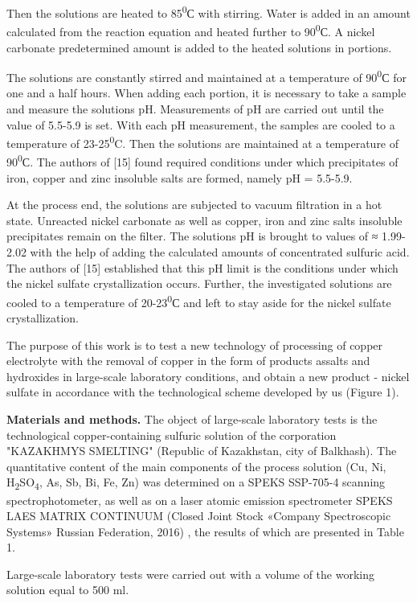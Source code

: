 \begin{multicols}{2}
Then the solutions are heated to 85\textsuperscript{0}С with stirring.
Water is added in an amount calculated from the reaction equation and
heated further to 90\textsuperscript{0}С. A nickel carbonate
predetermined amount is added to the heated solutions in portions.

The solutions are constantly stirred and maintained at a temperature of
90\textsuperscript{0}С for one and a half hours. When adding each
portion, it is necessary to take a sample and measure the solutions pH.
Measurements of pH are carried out until the value of 5.5-5.9 is set.
With each pH measurement, the samples are cooled to a temperature of
23-25\textsuperscript{0}C. Then the solutions are maintained at a
temperature of 90\textsuperscript{0}С. The authors of {[}15{]} found
required conditions under which precipitates of iron, copper and zinc
insoluble salts are formed, namely pH = 5.5-5.9.

At the process end, the solutions are subjected to vacuum filtration in
a hot state. Unreacted nickel carbonate as well as copper, iron and zinc
salts insoluble precipitates remain on the filter. The solutions pH is
brought to values of ≈ 1.99-2.02 with the help of adding the calculated
amounts of concentrated sulfuric acid. The authors of {[}15{]}
established that this pH limit is the conditions under which the nickel
sulfate crystallization occurs. Further, the investigated solutions are
cooled to a temperature of 20-23\textsuperscript{0}С and left to stay
aside for the nickel sulfate crystallization.

The purpose of this work is to test a new technology of processing of
copper electrolyte with the removal of copper in the form of products
assalts and hydroxides in large-scale laboratory conditions, and obtain
a new product - nickel sulfate in accordance with the technological
scheme developed by us (Figure 1).

{\bfseries Materials and methods.} The object of large-scale laboratory
tests is the technological copper-containing sulfuric solution of the
corporation "KAZAKHMYS SMELTING" (Republic of Kazakhstan, city of
Balkhash). The quantitative content of the main components of the
process solution (Cu, Ni, H\textsubscript{2}SO\textsubscript{4}, As, Sb,
Bi, Fe, Zn) was determined on a SPEKS SSP-705-4 scanning
spectrophotometer, as well as on a laser atomic emission spectrometer
SPEKS LAES MATRIX CONTINUUM (Closed Joint Stock «Company Spectroscopic
Systems» Russian Federation, 2016) , the results of which are presented
in Table 1.

Large-scale laboratory tests were carried out with a volume of the
working solution equal to 500 ml.
\end{multicols}

